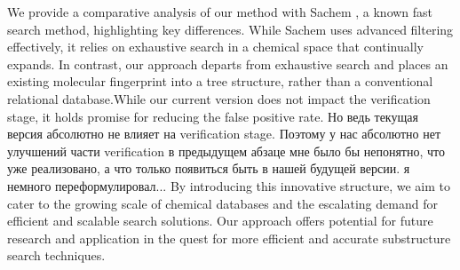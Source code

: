 We provide a comparative analysis of our method with Sachem  \cite{Kratochvil2018}, a known fast search method, highlighting key differences. While Sachem 
uses advanced filtering effectively, it relies on exhaustive search in a chemical space that continually expands. In contrast, 
our approach departs from exhaustive search and places an existing molecular fingerprint into a tree structure, rather than a 
conventional relational database.While our current version does not impact the verification stage, it holds promise for reducing the false positive rate. 
{\color{red} Но ведь текущая версия абсолютно не влияет на verification stage. Поэтому у нас абсолютно нет улучшений части verification}
{\color{red} в предыдущем абзаце мне было бы непонятно, что уже реализовано, а что только появиться быть в нашей будущей версии. }
{\color{blue} я немного переформулировал... }
By introducing this innovative structure, we aim to cater to the growing scale of chemical databases and the escalating demand 
for efficient and scalable search solutions. Our approach offers potential for future research and application in the quest 
for more efficient and accurate substructure search techniques.
